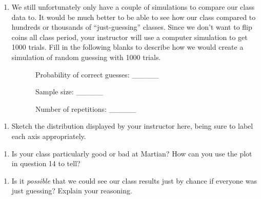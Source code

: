 \documentclass[
]{report}
\providecommand{\tightlist}{%
  \setlength{\itemsep}{0pt}\setlength{\parskip}{0pt}}
\begin{document}
\vspace{1in}

\begin{enumerate}
\def\labelenumi{\arabic{enumi}.}
\setcounter{enumi}{12}
\tightlist
\item
  We still unfortunately only have a couple of simulations to compare our class data to. It would be much better to be able to see how our class compared to hundreds or thousands of ``just-guessing'' classes. Since we don't want to flip coins all class period, your instructor will use a computer simulation to get 1000 trials. Fill in the following blanks to describe how we would create a simulation of random guessing with 1000 trials.
\end{enumerate}

~~~~~~~~~~Probability of correct guesses: \_\_\_\_\_

\vspace{0.05in}

~~~~~~~~~~Sample size: \_\_\_\_\_

\vspace{0.05in}

~~~~~~~~~~Number of repetitions: \_\_\_\_\_

\vspace{0.05in}

\begin{enumerate}
\def\labelenumi{\arabic{enumi}.}
\setcounter{enumi}{13}
\tightlist
\item
  Sketch the distribution displayed by your instructor here, being sure to label each axis appropriately.
\end{enumerate}

\vspace{1.5in}

\begin{enumerate}
\def\labelenumi{\arabic{enumi}.}
\setcounter{enumi}{14}
\tightlist
\item
  Is your class particularly good or bad at Martian? How can you use the plot in question 14 to tell?
\end{enumerate}

\vspace{.8in}

\begin{enumerate}
\def\labelenumi{\arabic{enumi}.}
\setcounter{enumi}{15}
\tightlist
\item
  Is it \emph{possible} that we could see our class results just by chance if everyone was just guessing? Explain your reasoning.
\end{enumerate}
\end{document}
